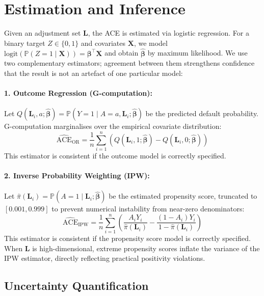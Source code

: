 \documentclass[11pt, a4paper]{article}
\theoremstyle{definition}
\begin{document}
\section{Estimation and Inference}

Given an adjustment set $\mathbf{L}$, the ACE is estimated via logistic regression. For a
binary target $Z \in \{0,1\}$ and covariates $\mathbf{X}$, we model
$\text{logit}(\mathbb{P}(Z=1 \mid \mathbf{X})) = \boldsymbol{\beta}^\top \mathbf{X}$ and
obtain $\hat{\boldsymbol{\beta}}$ by maximum likelihood. We use two complementary
estimators; agreement between them strengthens confidence that the result is not an
artefact of one particular model:

\paragraph{1. Outcome Regression (G-computation):}
Let $Q(\mathbf{L}_i, a; \hat{\boldsymbol{\beta}}) = \mathbb{P}(Y=1 \mid A=a, \mathbf{L}_i;
\hat{\boldsymbol{\beta}})$ be the predicted default probability. G-computation marginalises
over the empirical covariate distribution:
\begin{equation*}
    \widehat{\text{ACE}}_{\text{OR}} = \frac{1}{n} \sum_{i=1}^n
    \left( Q(\mathbf{L}_i, 1; \hat{\boldsymbol{\beta}}) -
           Q(\mathbf{L}_i, 0; \hat{\boldsymbol{\beta}}) \right)
\end{equation*}
This estimator is consistent if the outcome model is correctly specified.

\paragraph{2. Inverse Probability Weighting (IPW):}
Let $\hat{\pi}(\mathbf{L}_i) = \mathbb{P}(A=1 \mid \mathbf{L}_i; \hat{\boldsymbol{\beta}})$
be the estimated propensity score, truncated to $[0.001, 0.999]$ to prevent numerical
instability from near-zero denominators:
\begin{equation*}
    \widehat{\text{ACE}}_{\text{IPW}} = \frac{1}{n} \sum_{i=1}^n
    \left( \frac{A_i Y_i}{\hat{\pi}(\mathbf{L}_i)} -
           \frac{(1-A_i)Y_i}{1-\hat{\pi}(\mathbf{L}_i)} \right)
\end{equation*}
This estimator is consistent if the propensity score model is correctly specified. When
$\mathbf{L}$ is high-dimensional, extreme propensity scores inflate the variance of the
IPW estimator, directly reflecting practical positivity violations.

\subsection{Uncertainty Quantification}
\end{document}
